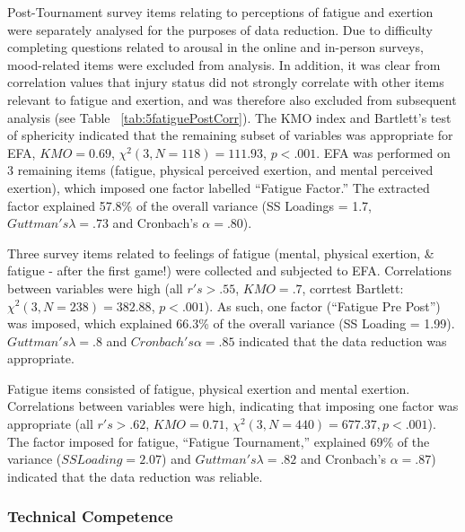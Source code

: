 Post-Tournament survey items relating to perceptions of fatigue and exertion were separately analysed for the purposes of data reduction.  Due to difficulty completing questions related to arousal in the online and in-person surveys, mood-related items were excluded from analysis.  In addition, it was clear from correlation values that injury status did not strongly correlate with other items relevant to fatigue and exertion, and was therefore also excluded from subsequent analysis (see Table ~\ref{tab:5fatiguePostCorr}).  The KMO index and Bartlett's test of sphericity indicated that the remaining subset of variables was appropriate for EFA, $KMO =  0.69$, $\chi^2(3, N = 118) = 111.93$, $p < .001$. EFA was performed on 3 remaining items (fatigue, physical perceived exertion, and mental perceived exertion), which imposed one factor labelled ``Fatigue Factor.''  The extracted factor explained 57.8\% of the overall variance (SS Loadings = 1.7, $Guttman's\lambda =.73$ and Cronbach's $\alpha = .80$).

Three survey items related to feelings of fatigue (mental, physical exertion, & fatigue - after the first game!)  were collected and subjected to EFA.
Correlations between variables were high (all $r's > .55$, $KMO = .7$, corrtest Bartlett: $\chi^2(3, N = 238) = 382.88$, $p < .001$).  As such, one factor (``Fatigue Pre Post'') was imposed, which explained 66.3\% of the overall variance (SS Loading = 1.99).  $Guttman's \lambda =.8$ and $Cronbach's \alpha = .85$ indicated that the data reduction was appropriate.

Fatigue items consisted of fatigue, physical exertion and mental exertion. Correlations between variables were high, indicating that imposing one factor was appropriate (all $r's > .62$, $KMO = 0.71$, $\chi^2(3, N = 440) =  677.37, p < .001$).  The factor imposed for fatigue, ``Fatigue Tournament,'' explained 69\% of the variance ($SS Loading = 2.07$) and $Guttman's \lambda =.82$ and Cronbach's $\alpha = .87$) indicated that the data reduction was reliable.


\subsubsection{Technical Competence \label{app8:technicalCompetenceEFA}}

